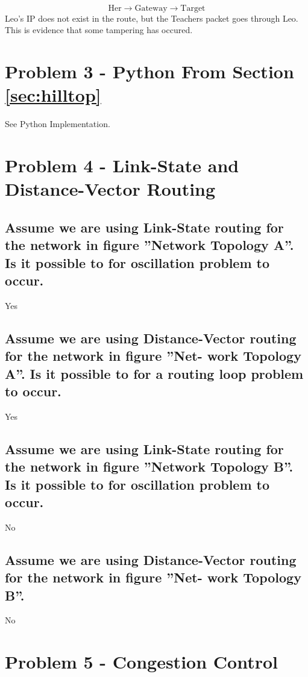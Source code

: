 \documentclass{article}
\begin{document}
	\[
		\text{Her} \xrightarrow{} \text{Gateway} \xrightarrow{} \text{Target}
	\]
	Leo's IP does not exist in the route, but the Teachers packet goes through Leo.
	This is evidence that some tampering has occured.

\section{Problem 3 - Python From Section \ref{sec:hilltop}}

See Python Implementation.

\section{Problem 4 - Link-State and Distance-Vector Routing}

\subsection{Assume we are using Link-State routing for the network in figure  ”Network
Topology A”. Is it possible to for oscillation problem to occur.}

Yes

\subsection{Assume we are using Distance-Vector routing for the network in figure ”Net-
work Topology A”. Is it possible to for a routing loop problem to occur.}

Yes

\subsection{Assume we are using Link-State routing for the network in figure ”Network
Topology B”. Is it possible to for oscillation problem to occur.}

No

\subsection{Assume we are using Distance-Vector routing for the network in figure ”Net-
work Topology B”.}

No

\section{Problem 5 - Congestion Control}
\end{document}
